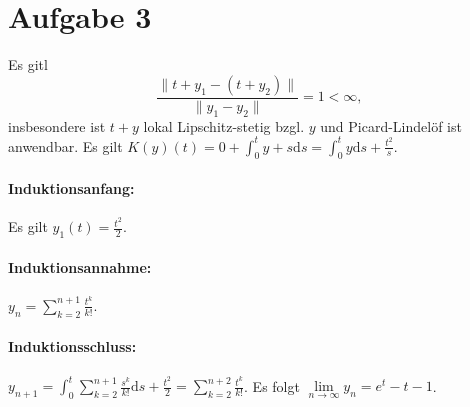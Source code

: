 \documentclass{article}
\begin{document}
    \section*{Aufgabe 3}
    Es gitl 
    \[
        \frac{\lVert t + y_1 - (t + y_2)\rVert}{\lVert y_1 - y_2\rVert} = 1 < \infty,
    \]
    insbesondere ist $t + y$ lokal Lipschitz-stetig bzgl. $y$ und Picard-Lindelöf ist anwendbar.
    Es gilt $K(y)(t) = 0 + \int_0^t y + s\mathrm{d} s = \int_0^t y\mathrm{d}s + \frac{t^2}{s}$.
    \paragraph{Induktionsanfang:} Es gilt $y_1(t) = \frac{t^2}{2}$.
    \paragraph{Induktionsannahme:} $y_n = \sum_{k = 2}^{n+1} \frac{t^k}{k!}$.
    \paragraph{Induktionsschluss:} $y_{n+1} = \int_0^t \sum_{k = 2}^{n+1} \frac{s^k}{k!} \mathrm{d} s + \frac{t^2}{2} = \sum_{k = 2}^{n+2} \frac{t^k}{k!}$.
    Es folgt $\lim\limits_{n \to \infty} y_n = e^t - t - 1$.
\end{document}
